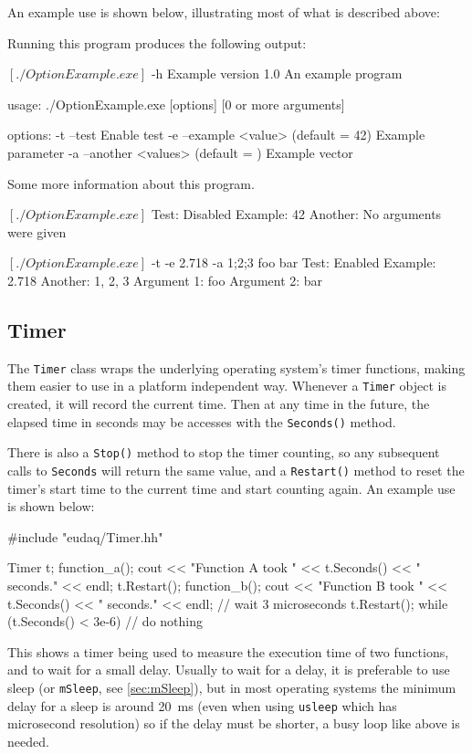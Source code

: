 An example use is shown below, illustrating most of what is described above:


Running this program produces the following output:
\begin{listing}[mybash]
$[./OptionExample.exe]$ -h
Example version 1.0
An example program

usage: ./OptionExample.exe [options] [0 or more arguments]

options:
  -t --test
     Enable test
  -e --example <value>	(default = 42)
     Example parameter
  -a --another <values>	(default = )
     Example vector

Some more information about this program.

$[./OptionExample.exe]$
Test: Disabled
Example: 42
Another: 
No arguments were given

$[./OptionExample.exe]$ -t -e 2.718 -a 1;2;3 foo bar
Test: Enabled
Example: 2.718
Another: 1, 2, 3
Argument 1: foo
Argument 2: bar
\end{listing}

\subsection{Timer}
The \texttt{Timer} class wraps the underlying operating system's timer functions,
making them easier to use in a platform independent way.
Whenever a \texttt{Timer} object is created, it will record the current time.
Then at any time in the future, the elapsed time in seconds may be accesses
with the \texttt{Seconds()} method.

There is also a \texttt{Stop()} method to stop the timer counting, so any subsequent calls
to \texttt{Seconds} will return the same value, and a \texttt{Restart()} method to
reset the timer's start time to the current time and start counting again.
An example use is shown below:
\begin{listing}[C++]
#include "eudaq/Timer.hh"

Timer t;
function_a();
cout << "Function A took " << t.Seconds() << " seconds." << endl;
t.Restart();
function_b();
cout << "Function B took " << t.Seconds() << " seconds." << endl;
// wait 3 microseconds
t.Restart();
while (t.Seconds() < 3e-6) {
  // do nothing
}
\end{listing}

This shows a timer being used to measure the execution time of two functions,
and to wait for a small delay.
Usually to wait for a delay, it is preferable to use sleep (or \texttt{mSleep}, see \autoref{sec:mSleep}),
but in most operating systems the minimum delay for a sleep is around 20~ms
(even when using \texttt{usleep} which has microsecond resolution)
so if the delay must be shorter, a busy loop like above is needed.

